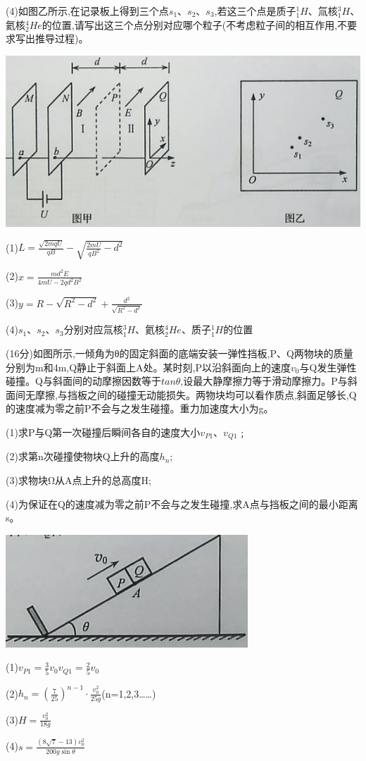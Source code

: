 (4)如图乙所示,在记录板上得到三个点$s_1$、$s_2$、$s_3$,若这三个点是质子$_1^1H$、氚核$_1^3H$、氦核$_2^4He$的位置,请写出这三个点分别对应哪个粒子(不考虑粒子间的相互作用,不要求写出推导过程)。\begin{center}\includegraphics[]{img/image15.png}\end{center}
\begin{solution}{4cm}
    (1)$L=\frac{\sqrt{2mqU}}{qB}-\sqrt{\frac{2mU}{qB^2}-d^2}$

    (2)$x=\frac{md^2E}{4mU-2qd^2B^2}$

    (3)$y=R-\sqrt{R^2-d^2}+\frac{d^2}{\sqrt{R^2-d^2}}$

    (4)$s_1$、$s_2$、$s_3$分别对应氚核$_1^3H$、氦核$_2^4He$、质子$_1^1H$的位置
\end{solution}
\newpage
\question[6] (16分)如图所示,一倾角为θ的固定斜面的底端安装一弹性挡板,P、Q两物块的质量分别为m和4m,Q静止于斜面上A处。某时刻,P以沿斜面向上的速度$v_0$与Q发生弹性碰撞。Q与斜面间的动摩擦因数等于$tanθ$,设最大静摩擦力等于滑动摩擦力。P与斜面间无摩擦,与挡板之间的碰撞无动能损失。两物块均可以看作质点,斜面足够长,Q的速度减为零之前P不会与之发生碰撞。重力加速度大小为g。

(1)求P与Q第一次碰撞后瞬间各自的速度大小$v_{P1}$、$v_{Q1}﹔$

(2)求第n次碰撞使物块Q上升的高度$h_n;$

(3)求物块Ω从A点上升的总高度H;

(4)为保证在Q的速度减为零之前P不会与之发生碰撞,求A点与挡板之间的最小距离s。\begin{center}\includegraphics[]{img/image16.png}\end{center}
\begin{solution}{4cm}
    (1)$v_{P1}=\frac{3}{5}v_0$$v_{Q1}=\frac{2}{5}v_0$

    (2)$h_n=(\frac{7}{25})^{n-1}\cdot \frac{v_0^2}{25g}$(n=1,2,3……)

    (3)$H=\frac{v_0^2}{18g}$

    (4)$s=\frac{(8\sqrt{7}-13)v_0^2}{200g\sin\theta}$
\end{solution}
